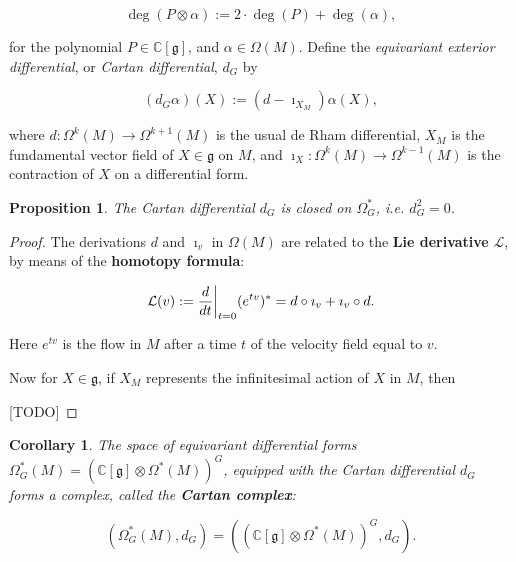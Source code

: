 \documentclass{article}
\newtheorem{prop}[theorem]{Proposition}
\newtheorem{corollary}[theorem]{Corollary}
\newcommand{\ie}{\emph{i.e.} }
\newcommand{\ra}{\rightarrow}
\newcommand{\W}{\Omega}
\newcommand{\CC}{\mathbb{C}}
\newcommand{\mcL}{\mathcal{L}}
\newcommand{\mfg}{\mathfrak{g}}
\newcommand{\mc}[1]{\mathcal{#1}}
\newcommand\restr[2]{{%
		\left.\kern-\nulldelimiterspace %
		#1 %
		\vphantom{\big|} %
		\right|_{#2} %
}}
\begin{document}
\begin{equation*}
	\deg(P \otimes \alpha) := 2\cdot \deg(P) + \deg(\alpha),
\end{equation*}

for the polynomial $P \in \CC[\mfg]$, and $\alpha \in \W(M)$. Define the \emph{equivariant exterior differential}, or \emph{Cartan differential}, $d_{G}$ by

\begin{equation*}
	(d_{G}\alpha)(X) := (d - \imath_{X_{M}}) \alpha(X),
\end{equation*}

where $d :\W^{k}(M) \ra \W^{k+1}(M)$ is the usual de Rham differential, $X_{M}$ is the fundamental vector field of $X \in \mfg$ on $M$, and $\imath_{X} : \W^{k}(M) \ra \W^{k-1}(M)$ is the contraction of $X$ on a differential form.

\begin{prop}
	The Cartan differential $d_{G}$ is closed on $\W_{G}^{\ast}$, \ie $d_{G}^{2} = 0$.
\end{prop}

\begin{proof}
	
	The derivations $d$ and $\imath_{v}$ in $\W(M)$ are related to the \textbf{Lie derivative} $\mcL$, by means of the \textbf{homotopy formula}:
	
	\begin{equation*}
		\mc{L}(v) := \restr{\frac{d}{dt}}{t = 0} (e^{tv})^{\ast} = d \circ \imath_{v} + \imath_{v} \circ d.
	\end{equation*}
	
	Here $e^{tv}$ is the flow in $M$ after a time $t$ of the velocity field equal to $v$.
	
	Now for $X \in \mfg$, if $X_{M}$ represents the infinitesimal action of $X$ in $M$, then 
	
	[TODO]
	
\end{proof}

\begin{corollary}
	The space of equivariant differential forms $\W_{G}^{\ast}(M) = \left( \CC[\mfg] \otimes \W^{\ast}(M) \right)^{G}$, equipped with the Cartan differential $d_{G}$ forms a complex, called the \textbf{Cartan complex}:
	
	\begin{equation*}
		\left( \W_{G}^{\ast}(M), d_{G} \right) = \left( (\CC[\mfg] \otimes \W^{\ast}(M)   )^{G}, d_{G} \right).
	\end{equation*}

\end{corollary}
\end{document}
